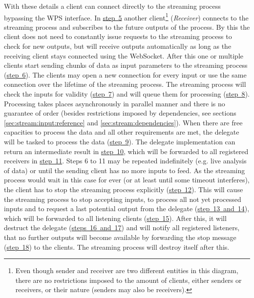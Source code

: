 	With these details a client can connect directly to the streaming process bypassing the \ac{WPS} interface. In \hyperref[fig:sd:swps]{step~5} another client\footnote{Even though sender and receiver are two different entities in this diagram, there are no restrictions imposed to the amount of clients, either senders or receivers, or their nature (senders may also be receivers).} (\emph{Receiver}) connects to the streaming process and subscribes to the future outputs of the process. By this the client does not need to constantly issue requests to the streaming process to check for new outputs, but will receive outputs automatically as long as the receiving client stays connected using the WebSocket.
	After this one or multiple clients start sending chunks of data as input parameters to the streaming process (\hyperref[fig:sd:swps]{step~6}). The clients may open a new connection for every input or use the same connection over the lifetime of the streaming process. The streaming process will check the inputs for validity (\hyperref[fig:sd:swps]{step~7}) and will queue them for processing (\hyperref[fig:sd:swps]{step~8}).
	Processing takes places asynchronously in parallel manner and there is no guarantee of order (besides restrictions imposed by dependencies, see sections \ref{sec:stream:input:reference} and \ref{sec:stream:dependencies}). When there are free capacities to process the data and all other requirements are met, the delegate will be tasked to process the data (\hyperref[fig:sd:swps]{step~9}). The delegate implementation can return an intermediate result in \hyperref[fig:sd:swps]{step~10}, which will be forwarded to all registered receivers in \hyperref[fig:sd:swps]{step~11}.
	Steps 6 to 11 may be repeated indefinitely (e.g. live analysis of data) or until the sending client has no more inputs to feed. As the streaming process would wait in this case for ever (or at least until some timeout interferes), the client has to stop the streaming process explicitly (\hyperref[fig:sd:swps]{step~12}).
	This will cause the streaming process to stop accepting inputs, to process all not yet processed inputs and to request a last potential output from the delegate (\hyperref[fig:sd:swps]{step~13~and~14}), which will be forwarded to all listening clients (\hyperref[fig:sd:swps]{step~15}). After this, it will destruct the delegate (\hyperref[fig:sd:swps]{steps~16~and~17}) and will notify all registered listeners, that no further outputs will become available by forwarding the stop message (\hyperref[fig:sd:swps]{step~18}) to the clients. The streaming process will destroy itself after this.


